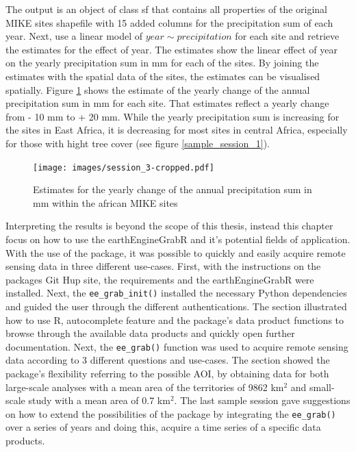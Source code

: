 The output is an object of class sf that contains all properties of the original MIKE sites shapefile with 15 added columns for the precipitation sum of each year.
Next, use a linear model of $year  \sim precipitation$ for each site and retrieve the estimates for the effect of year. 
The estimates show the linear effect of year on the yearly precipitation sum in mm for each of the sites. 
By joining the estimates with the spatial data of the sites, the estimates can be visualised spatially. 
Figure \ref{change} shows the estimate of the yearly change of the annual precipitation sum in mm for each site. That estimates reflect a yearly change from - 10 mm to + 20 mm. While the yearly precipitation sum is increasing for the sites in East Africa, it is decreasing for most sites in central Africa, especially for those with hight tree cover (see figure \ref*{sample_session_1}).

\begin{center}
	\begin{figure}[h]
		\begin{center}
			\texttt{[image: images/session\_3-cropped.pdf]}
			\caption{Estimates for the yearly change of the annual precipitation sum in mm within the african MIKE sites}
			\label{change}
		\end{center}
	\end{figure}
\end{center}



Interpreting the results is beyond the scope of this thesis, instead this chapter focus on how to use the earthEngineGrabR and it's potential fields of application.
With the use of the package, it was possible to quickly and easily acquire remote sensing data in three different use-cases. First, with the instructions on the packages Git Hup site, the requirements and the earthEngineGrabR were installed. Next, the \texttt{ee\_grab\_init()} installed the necessary Python dependencies and guided the user through the different authentications. The section illustrated how to use R, autocomplete feature and the package's data product functions to browse through the available data products and quickly open further documentation. Next, the \texttt{ee\_grab()} function was used to acquire remote sensing data according to 3 different questions and use-cases. The section showed the package's flexibility referring to the possible AOI, by obtaining data for both large-scale analyses with a mean area of the territories of 9862 km$^2$ and small-scale study with a mean area of 0.7 km$^2$.
The last sample session gave suggestions on how to extend the possibilities of the package by integrating the \texttt{ee\_grab()} over a series of years and doing this, acquire a time series of a specific data products.




